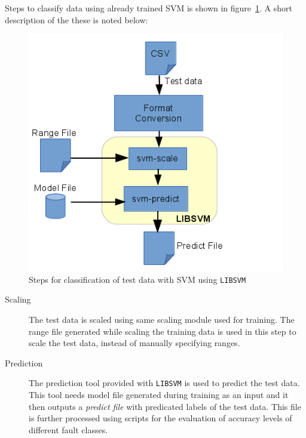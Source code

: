 Steps to classify data using already trained SVM is shown in figure~\ref{fig:libsvmpredict}. A short description of the these is noted below:

\begin{figure}[h]
  \begin{center}
    \captionsetup{justification=centering}
    \includegraphics[scale=0.75]{figures/libsvmpredict.png}
    \caption{Steps for classification of test data with SVM using \texttt{LIBSVM}}
    \label{fig:libsvmpredict}
  \end{center}
\end{figure}

\begin{description}

  \item[Scaling] The test data is scaled using same scaling module used for training. The range file generated while scaling the training data is used in this step to scale the test data, instead of manually specifying ranges.
  
  \item[Prediction] The prediction tool provided with \texttt{LIBSVM} is used to predict the test data. This tool needs model file generated during training as an input and it then outputs a \emph{predict file} with predicated labels of the test data. This file is further processed using scripts for the evaluation of accuracy levels of different fault classes.
  
\end{description}
